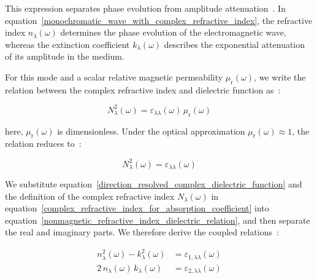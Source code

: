 This expression separates phase evolution from amplitude attenuation~\cite{wooten2013optical,dressel2002electrodynamics,born2013principles}.
In equation~\eqref{monochromatic_wave_with_complex_refractive_index},
the refractive index $n_{\lambda}(\omega)$ determines the phase evolution of the electromagnetic wave,
whereas the extinction coefficient $k_{\lambda}(\omega)$ describes the exponential attenuation of its amplitude in the medium.

For this mode and a scalar relative magnetic permeability $\mu_{\mathrm{r}}(\omega)$,
we write the relation between the complex refractive index and dielectric function as~\cite{born2013principles,wooten2013optical,dressel2002electrodynamics,politano2023spectroscopic}:

\begin{equation}
    N_{\lambda}^{2}(\omega)
    = \varepsilon_{\lambda\lambda}(\omega)\,\mu_{\mathrm{r}}(\omega)
\label{general_refractive_index_permeability_relation}
\end{equation}

here, $\mu_{\mathrm{r}}(\omega)$ is dimensionless.
Under the optical approximation $\mu_{\mathrm{r}}(\omega)\approx1$,
the relation reduces to~\cite{wooten2013optical,dressel2002electrodynamics,born2013principles}:

\begin{equation}
    N_{\lambda}^{2}(\omega)
    = \varepsilon_{\lambda\lambda}(\omega)
\label{nonmagnetic_refractive_index_dielectric_relation}
\end{equation}

We substitute equation~\eqref{direction_resolved_complex_dielectric_function}
and the definition of the complex refractive index $N_{\lambda}(\omega)$ in equation~\eqref{complex_refractive_index_for_absorption_coefficient}
into equation~\eqref{nonmagnetic_refractive_index_dielectric_relation},
and then separate the real and imaginary parts.
We therefore derive the coupled relations~\cite{wooten2013optical,dressel2002electrodynamics,fox2010optical}:

\begin{equation}
\begin{aligned}
    n_{\lambda}^{2}(\omega)-k_{\lambda}^{2}(\omega)
    &= \varepsilon_{1,\lambda\lambda}(\omega) \\
    2\,n_{\lambda}(\omega)\,k_{\lambda}(\omega)
    &= \varepsilon_{2,\lambda\lambda}(\omega)
\end{aligned}
\label{refractive_index_extinction_coefficient_auxiliary_relations}
\end{equation}

